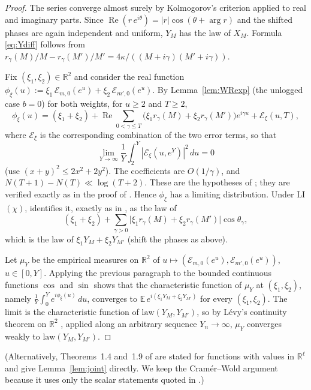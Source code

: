 \documentclass[11pt]{amsart}
\theoremstyle{definition}
\numberwithin{equation}{section}
\newcommand{\EE}{\mathbb E}
\newcommand{\cE}{\mathcal E}
\newcommand{\re}{\operatorname{Re}}
\begin{document}
\begin{proof}
The series converge almost surely by Kolmogorov's criterion applied
to real and imaginary parts. Since
$\re(r\,e^{i\theta})=|r|\cos(\theta+\arg r)$ and the shifted phases
are again independent and uniform, $Y_M$ has the law of $X_M$.
Formula \eqref{eq:Ydiff} follows from
$r_\gamma(M)/M-r_\gamma(M')/M'=4\kappa/((M+i\gamma)(M'+i\gamma))$.

Fix $(\xi_1,\xi_2)\in\mathbb R^2$ and consider the real function
$\phi_{\xi}(u):=\xi_1\,\cE_{m,0}(e^u)+\xi_2\,\cE_{m',0}(e^u)$. By
Lemma~\ref{lem:WRexp} (the unlogged case $b=0$) for both weights, for
$u\ge2$ and $T\ge2$,
\[
\phi_{\xi}(u)=(\xi_1+\xi_2)+\re\sum_{0<\gamma\le T}
\bigl(\xi_1r_\gamma(M)+\xi_2r_\gamma(M')\bigr)e^{i\gamma u}
+\cE_{\xi}(u,T),
\]
where $\cE_{\xi}$ is the corresponding combination of the two error
terms, so that
\[
\lim_{Y\to\infty}\frac1Y\int_2^Y|\cE_{\xi}(u,e^Y)|^2\,du=0
\]
(use $(x+y)^2\le2x^2+2y^2$). The coefficients are $O(1/\gamma)$, and
$N(T+1)-N(T)\ll\log(T+2)$. These are the hypotheses of
\cite[Corollary~1.3(a)]{ANS14}; they are verified exactly as in the
proof of \cite[Theorem~1(i)]{WR}. Hence $\phi_{\xi}$ has a limiting
distribution. Under LI$(\chi)$, \cite[Theorem~1.9]{ANS14}
identifies it, exactly as in \cite{WR}, as the law of
\[
(\xi_1+\xi_2)+\sum_{\gamma>0}\bigl|\xi_1r_\gamma(M)+\xi_2r_\gamma(M')\bigr|
\cos\theta_\gamma ,
\]
which is the law of $\xi_1Y_M+\xi_2Y_{M'}$ (shift the phases as
above).

Let $\mu_Y$ be the empirical measures on $\mathbb R^2$ of
$u\mapsto(\cE_{m,0}(e^u),\cE_{m',0}(e^u))$, $u\in[0,Y]$. Applying the
previous paragraph to the bounded continuous functions $\cos$ and
$\sin$ shows that the characteristic function of $\mu_Y$ at
$(\xi_1,\xi_2)$, namely $\frac1Y\int_0^Ye^{i\phi_{\xi}(u)}\,du$,
converges to $\EE\,e^{i(\xi_1Y_M+\xi_2Y_{M'})}$ for every
$(\xi_1,\xi_2)$. The limit is the characteristic function of
$\mathrm{law}(Y_M,Y_{M'})$, so by L\'evy's continuity theorem on
$\mathbb R^2$ \cite[Ch.~XV]{Fel71}, applied along an arbitrary
sequence $Y_n\to\infty$, $\mu_Y$ converges weakly to
$\mathrm{law}(Y_M,Y_{M'})$.
\end{proof}

(Alternatively, Theorems~1.4 and~1.9 of \cite{ANS14} are stated for
functions with values in $\mathbb R^\ell$ and give
Lemma~\ref{lem:joint} directly. We keep the Cram\'er--Wold argument
because it uses only the scalar statements quoted in \cite{WR}.)
\end{document}
